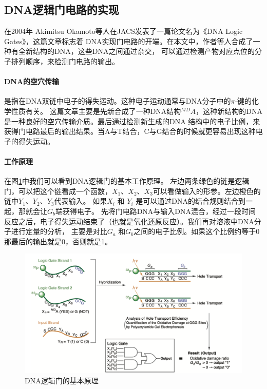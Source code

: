 \documentclass[a4paper,twoside]{article}
\begin{document}
\subsection{DNA逻辑门电路的实现}
在2004年 Akimitsu Okamoto等人在JACS发表了一篇论文名为《DNA Logic Gates》\cite{ref2}，这篇文章标志着
DNA实现门电路的开端。在本文中，作者等人合成了一种有全新结构的DNA，这些DNA之间通过杂交，
可以通过检测产物对应点位的分子排列顺序，来检测门电路的输出。

\paragraph{DNA的空穴传输}是指在DNA双链中电子的得失运动。这种电子运动通常与DNA分子中的$\pi$-键的化学性质有关。
这篇文章主要是先新合成了一种DNA结构$ ^{MD}A$，这种新结构的DNA是一种良好的空穴传输介质。最后通过检测新生成的DNA
结构中的电子比例，来获得门电路最后的输出结果。当A与T结合，C与G结合的时候就更容易出现这种电子的得失运动。

\paragraph{工作原理} 在图\ref{dna-logic-gate-implement}中我们可以看到DNA逻辑门的基本工作原理。
左边两条绿色的链是逻辑门，可以把这个链看成一个函数，$X_1、 X_2、 X_3$可以看做输入的形参。左边橙色的链中$Y_1、 Y_2、 Y_3$代表输入。
如果$X_i$ 和 $Y_i$ 是可以通过DNA的结合规则结合到一起，那就会让$G_b$端获得电子。
先将门电路DNA与输入DNA混合，经过一段时间反应之后，电子得失运动结束了（也就是氧化还原反应）。我们再对溶液中DNA分子进行定量的分析，
主要是对比$G_a$ 和$G_b$之间的电子比例。如果这个比例约等于0那最后的输出就是0，否则就是1。

\begin{figure}[htbp]
	\centering
	\includegraphics[width=0.95\linewidth]{images/dna-logic-gate1.png}
	\caption{DNA逻辑门的基本原理}
	\label{dna-logic-gate-implement}
\end{figure}
\end{document}
